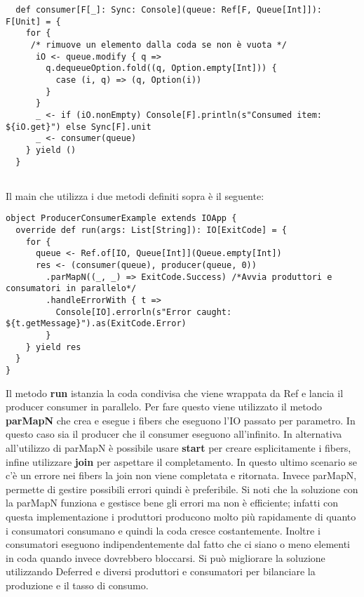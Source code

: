 \begin{verbatim}
  def consumer[F[_]: Sync: Console](queue: Ref[F, Queue[Int]]): F[Unit] = {
    for {
     /* rimuove un elemento dalla coda se non è vuota */
      iO <- queue.modify { q =>
        q.dequeueOption.fold((q, Option.empty[Int])) {
          case (i, q) => (q, Option(i))
        }
      }
      _ <- if (iO.nonEmpty) Console[F].println(s"Consumed item: ${iO.get}") else Sync[F].unit
      _ <- consumer(queue)
    } yield ()
  }
    
\end{verbatim}
\noindent Il main che utilizza i due metodi definiti sopra è il seguente:

\begin{verbatim}
object ProducerConsumerExample extends IOApp {
  override def run(args: List[String]): IO[ExitCode] = {
    for {
      queue <- Ref.of[IO, Queue[Int]](Queue.empty[Int])
      res <- (consumer(queue), producer(queue, 0))
        .parMapN((_, _) => ExitCode.Success) /*Avvia produttori e consumatori in parallelo*/
        .handleErrorWith { t =>
          Console[IO].errorln(s"Error caught: ${t.getMessage}").as(ExitCode.Error)
        }
    } yield res
  }
}    
\end{verbatim}

\noindent Il metodo \textbf{run} istanzia la coda condivisa che viene wrappata da Ref e lancia il producer consumer in parallelo. Per fare questo viene utilizzato il metodo \textbf{parMapN} che crea e esegue i fibers che eseguono l’IO passato per parametro. In questo caso sia il producer che il consumer eseguono all’infinito. In alternativa all’utilizzo di parMapN è possibile usare \textbf{start} per creare esplicitamente
i fibers, infine utilizzare \textbf{join} per aspettare il completamento. In questo ultimo scenario se c’è un errore nei fibers la join non viene completata e ritornata. Invece parMapN, permette di gestire possibili errori quindi è preferibile. Si noti che la soluzione con la parMapN funziona e gestisce bene gli errori ma non è efficiente; infatti con questa implementazione i produttori producono molto più rapidamente di quanto i consumatori consumano e quindi la coda cresce costantemente. Inoltre i consumatori eseguono indipendentemente dal fatto che ci siano o meno elementi in coda quando invece dovrebbero bloccarsi. Si può migliorare la soluzione utilizzando Deferred e diversi produttori e consumatori per bilanciare la produzione e il tasso di consumo.

